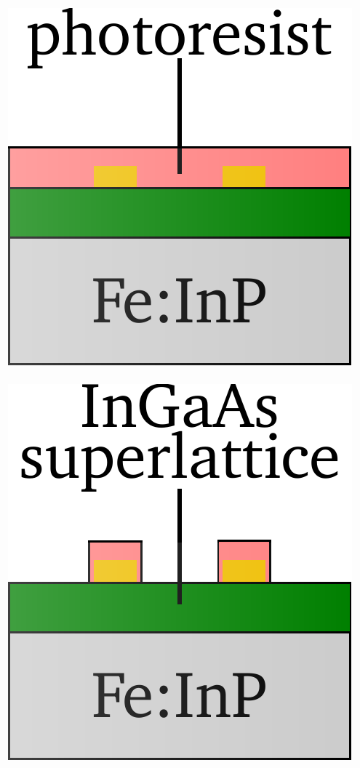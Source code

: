 \begin{figure}[!]
    \centering
    \begin{subfigure}[b]{0.21\textwidth}
        \centering
        \includegraphics[width=\textwidth]{figures/Fabrication/fab2_1.pdf}
        \caption{\centering}
        \label{fig:fab21}
    \end{subfigure}
    \hfill
    \begin{subfigure}[b]{0.21\textwidth}
        \centering
        \includegraphics[width=\textwidth]{figures/Fabrication/fab2_2.pdf}

\end{subfigure}
\end{figure}

